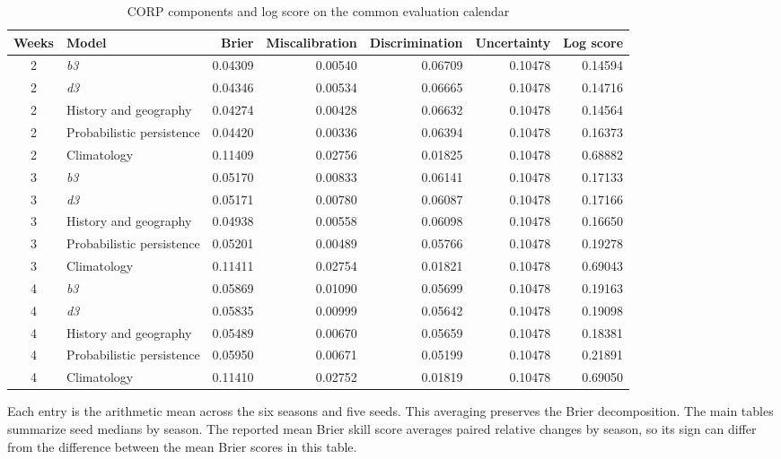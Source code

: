 \documentclass[10pt]{article}
\newcommand{\bthree}{\textit{b3}}
\newcommand{\dthree}{\textit{d3}}
\begin{document}
\begin{table}[!h]
\centering
\caption{CORP components and log score on the common evaluation calendar}
\small
\begin{tabular}{@{}clrrrrr@{}}
\toprule
Weeks & Model & Brier & Miscalibration & Discrimination & Uncertainty & Log score\\
\midrule
2 & \bthree{} & 0.04309 & 0.00540 & 0.06709 & 0.10478 & 0.14594\\
2 & \dthree{} & 0.04346 & 0.00534 & 0.06665 & 0.10478 & 0.14716\\
2 & History and geography & 0.04274 & 0.00428 & 0.06632 & 0.10478 & 0.14564\\
2 & Probabilistic persistence & 0.04420 & 0.00336 & 0.06394 & 0.10478 & 0.16373\\
2 & Climatology & 0.11409 & 0.02756 & 0.01825 & 0.10478 & 0.68882\\
3 & \bthree{} & 0.05170 & 0.00833 & 0.06141 & 0.10478 & 0.17133\\
3 & \dthree{} & 0.05171 & 0.00780 & 0.06087 & 0.10478 & 0.17166\\
3 & History and geography & 0.04938 & 0.00558 & 0.06098 & 0.10478 & 0.16650\\
3 & Probabilistic persistence & 0.05201 & 0.00489 & 0.05766 & 0.10478 & 0.19278\\
3 & Climatology & 0.11411 & 0.02754 & 0.01821 & 0.10478 & 0.69043\\
4 & \bthree{} & 0.05869 & 0.01090 & 0.05699 & 0.10478 & 0.19163\\
4 & \dthree{} & 0.05835 & 0.00999 & 0.05642 & 0.10478 & 0.19098\\
4 & History and geography & 0.05489 & 0.00670 & 0.05659 & 0.10478 & 0.18381\\
4 & Probabilistic persistence & 0.05950 & 0.00671 & 0.05199 & 0.10478 & 0.21891\\
4 & Climatology & 0.11410 & 0.02752 & 0.01819 & 0.10478 & 0.69050\\
\bottomrule
\end{tabular}

\vspace{2pt}\parbox{0.9\textwidth}{\footnotesize Each entry is the arithmetic mean across the six seasons and five seeds. This averaging preserves the Brier decomposition. The main tables summarize seed medians by season. The reported mean Brier skill score averages paired relative changes by season, so its sign can differ from the difference between the mean Brier scores in this table.}
\end{table}
\end{document}
